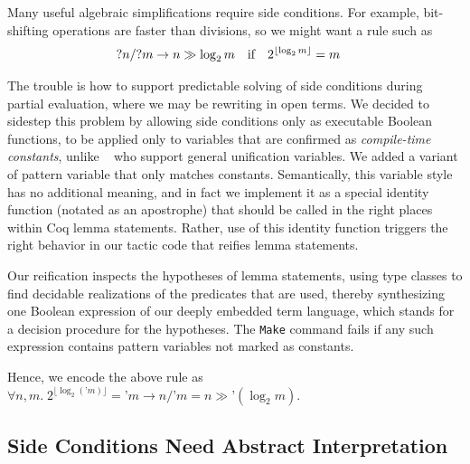 \documentclass[sn-mathphys,pdflatex]{sn-jnl}%
\newcommand{\citetfield}[1]{\usebibentry{#1}{citet}~\cite{#1}}
\theoremstyle{thmstyleone}%
\theoremstyle{thmstyletwo}%
\theoremstyle{thmstylethree}%
\begin{document}
Many useful algebraic simplifications require side conditions.
For example, bit-shifting operations are faster than divisions, so we might want a rule such as
\begin{align*}
  {?n} / {?m} & \to n \gg \log_2 m\text{\quad if\quad }2^{\lfloor \log_2 m \rfloor} = m
\end{align*}

The trouble is how to support predictable solving of side conditions during partial evaluation, where we may be rewriting in open terms.
We decided to sidestep this problem by allowing side conditions only as executable Boolean functions, to be applied only to variables that are confirmed as \emph{compile-time constants}, unlike \citetfield{rtac} who support general unification variables.
We added a variant of pattern variable that only matches constants.
Semantically, this variable style has no additional meaning, and in fact we implement it as a special identity function (notated as an apostrophe) that should be called in the right places within Coq lemma statements.
Rather, use of this identity function triggers the right behavior in our tactic code that reifies lemma statements.
\label{sec:explain-'}

Our reification inspects the hypotheses of lemma statements, using type classes to find decidable realizations of the predicates that are used, thereby synthesizing one Boolean expression of our deeply embedded term language, which stands for a decision procedure for the hypotheses.
The \texttt{Make} command fails if any such expression contains pattern variables not marked as constants.

Hence, we encode the above rule as $\forall n, m. \; 2^{\lfloor \log_2(\texttt{'}m)\rfloor} = \texttt{'}m \to n / \texttt{'}m = n \gg \texttt{'}(\log_2 m)$.

\subsection{Side Conditions Need Abstract Interpretation}\label{sec:abs-int}
\end{document}

